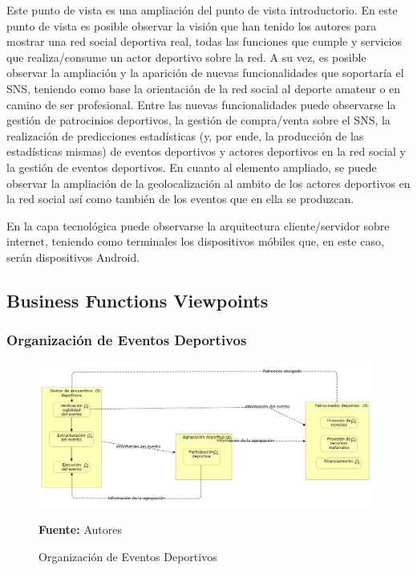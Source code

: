 Este punto de vista es una ampliación del punto de vista introductorio. En este punto de vista es posible observar la visión que han tenido los autores para mostrar una red social deportiva real, todas las funciones que cumple y servicios que realiza/consume un actor deportivo sobre la red. A su vez, es posible observar la ampliación y la aparición de nuevas funcionalidades que soportaría el SNS, teniendo como base la orientación de la red social al deporte amateur o en camino de ser profesional. Entre las nuevas funcionalidades puede observarse la gestión de patrocinios deportivos, la gestión de compra/venta sobre el SNS, la realización de predicciones estadísticas (y, por ende, la producción de las estadísticas mismas) de eventos deportivos y actores deportivos en la red social y la gestión de eventos deportivos. En cuanto al elemento ampliado, se puede observar la ampliación de la geolocalización al ambito de los actores deportivos en la red social así como también de los eventos que en ella se produzcan.

En la capa tecnológica puede observarse la arquitectura cliente/servidor sobre internet, teniendo como terminales los dispositivos móbiles que, en este caso, serán dispositivos Android.

\subsection{Business Functions Viewpoints}

\subsubsection{Organización de Eventos Deportivos}

\begin{figure}[!htb]
  \begin{center}
    \includegraphics[width=11cm]{./imagenes/Archimate/vistas/business_functions/organizacioneventosdeportivos.png}
    \caption{Organización de Eventos Deportivos}
    \label{fig:bf_organizacion_eventos_deportivos}
    \textbf{Fuente:}  Autores
  \end{center}
\end{figure}


